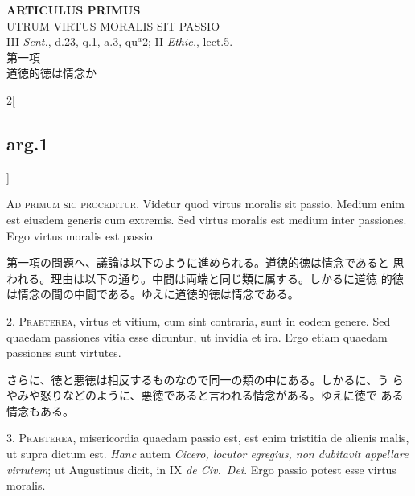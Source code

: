 \documentclass[paper=a4paper,fontsize=10pt,jafontsize=9pt,titlepage]{jlreq}
\begin{document}
\begin{center}
{\Large {\bfseries ARTICULUS PRIMUS}}\\
{\large UTRUM VIRTUS MORALIS SIT PASSIO}\\
{\footnotesize III {\itshape Sent.}, d.23, q.1, a.3, qu$^{a}$2; II {\itshape Ethic.}, lect.5.}\\
{\Large 第一項\\道徳的徳は情念か}
\end{center}

\begin{paracol}{2}[\subsection{arg.1}]

{\scshape Ad primum sic proceditur}. Videtur quod virtus moralis sit
passio. Medium enim est eiusdem generis cum extremis. Sed virtus
moralis est medium inter passiones. Ergo virtus moralis est passio.

\switchcolumn

第一項の問題へ、議論は以下のように進められる。道徳的徳は情念であると
 思われる。理由は以下の通り。中間は両端と同じ類に属する。しかるに道徳
 的徳は情念の間の中間である。ゆえに道徳的徳は情念である。


2. {\scshape Praeterea}, virtus et vitium, cum sint contraria, sunt in
eodem genere. Sed quaedam passiones vitia esse dicuntur, ut invidia et
ira. Ergo etiam quaedam passiones sunt virtutes.

\switchcolumn

さらに、徳と悪徳は相反するものなので同一の類の中にある。しかるに、う
 らやみや怒りなどのように、悪徳であると言われる情念がある。ゆえに徳で
 ある情念もある。


3. {\scshape Praeterea}, misericordia quaedam passio est, est enim
tristitia de alienis malis, ut supra dictum est. {\itshape Hanc} autem
{\itshape Cicero, locutor egregius, non dubitavit appellare virtutem};
ut Augustinus dicit, in IX {\itshape de Civ.~Dei}. Ergo passio potest
esse virtus moralis.


\end{paracol}
\end{document}
